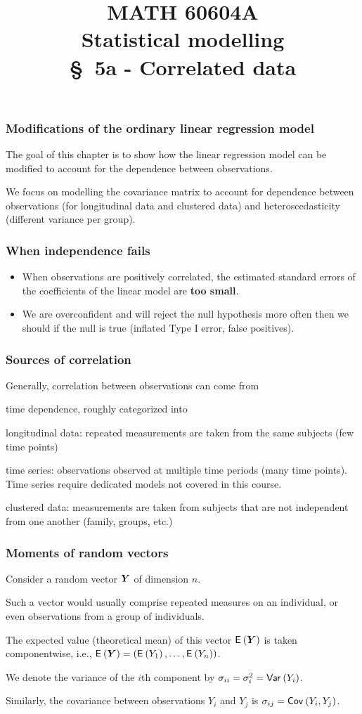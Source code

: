 \documentclass{beamer}
\title[\color{white}{MATH 60604A \S~5a - Correlated data}]{\texorpdfstring{MATH 60604A \\Statistical modelling \\ \S~5a - Correlated data}{MATH 60604A \\Statistical modelling \\ \S~5a - Correlated data}}
\author{}
\institute{HEC Montréal\\
Department of Decision Sciences}
\date{}
\begin{document}
\frame{\titlepage}
\begin{frame}
\frametitle{Modifications of the ordinary linear regression model}
\bi \item The goal of this chapter is to show how the linear regression model can be modified to account for the dependence between observations.
\item 
We focus on modelling the covariance matrix to account for dependence between observations (for longitudinal data and clustered data) and heteroscedasticity (different variance per group).
\ei

\end{frame}
\begin{frame}
 \frametitle{When independence fails}
 \begin{itemize}
  \item When observations are positively correlated, the estimated standard errors of the coefficients of the linear model are \textbf{too small}.
  \item We are overconfident and will reject the null hypothesis more often then we should if the null is true (inflated Type I error, false positives).
  
  \end{itemize}
  \end{frame}
  \begin{frame}
  \frametitle{Sources of correlation}
  Generally, correlation between observations can come from 
\bi
\item  time dependence, roughly categorized into
\bi \item longitudinal data: repeated measurements are taken from the same subjects (few time points)
\item time series: observations observed at multiple time periods (many time points). Time series require dedicated models not covered in this course.
\ei 
\item  clustered data: measurements are taken from subjects that are not independent from one another (family, groups, etc.)
\ei
\end{frame}


\begin{frame}
\frametitle{Moments of random vectors}
\bi
\item Consider a \alert{random vector} $\boldsymbol {Y}$ of dimension $n$. 
\bi
\item Such a vector would usually comprise
repeated measures on an individual, or even observations from a group of individuals. 
\ei
\item The expected value (theoretical mean) of this vector ${\mathsf E}_{}\left(\boldsymbol {Y}\right)$ is taken componentwise, i.e., ${\mathsf E}_{}\left(\boldsymbol {Y}\right) = ({\mathsf E}_{}\left(Y_1\right), \ldots, {\mathsf E}_{}\left(Y_n\right))$.
\item We denote the variance of the $i$th component by $\sigma_{ii} = \sigma^2_i={\mathsf{Var}_{}}\left(Y_i\right)$.
\item Similarly, the covariance between observations $Y_i$ and $Y_j$ is  $\sigma_{ij}={\mathsf{Cov}_{}}\left(Y_i, Y_j\right)$.
\ei
\end{frame}
\end{document}
